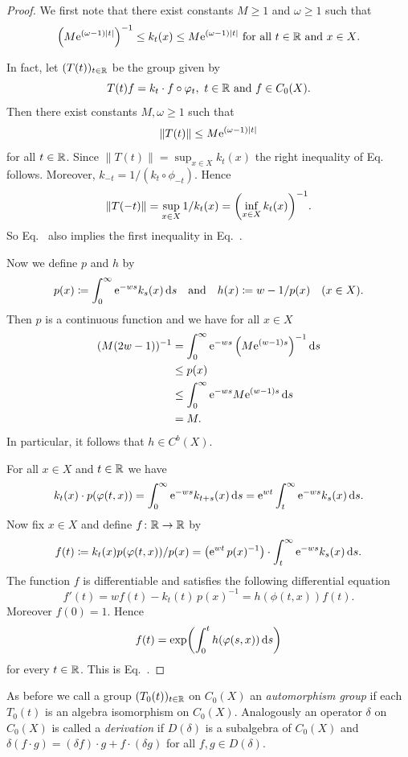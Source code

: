 \begin{proof}
We first note that there exist constants $M \geq 1 $ and $\omega \geq 1$ such that
\begin{equation}\label{eq:b2-3.16}
\mleft( M\eu^{(\omega-1)|t|} \mright)^{-1} \leq k_{t}(x) 
	\leq M\eu^{(\omega-1)|t|} \text{ for all $t \in \R$ and  $x \in X$.}
\end{equation}

In fact, let $(T(t))_{t \in \mathbb{R}}$ be the group given by 
%
\[
	T(t)f = k_{t} \cdot f \circ \phi_{t}, 
	\text{ $ t \in \R$ and $f \in C_{0}(X)$}.
\]
%
Then there exist constants $M, \omega \geq 1$ such that
\begin{equation}\label{eq:b2-3.17}
\|T(t)\| \leq M\eu^{(\omega-1)|t|}
\end{equation}
for all $t \in \mathbb{R}$.
Since $\|T(t)\| = \sup_{x \in X} k_{t}(x)$ the right inequality of
Eq.~ follows.
Moreover, $k_{-t} = 1/(k_{t} \circ \phi_{-t})$.
Hence 
%
\[
	\|T(-t)\| = \sup_{x \in X} 1/k_{t}(x) = \mleft( \inf_{x \in X} k_{t}(x) \mright)^{-1} .
\]
%
So Eq.~ also implies the first inequality in Eq.~.

Now we define $p$ and $h$ by
\[
p(x) \coloneq \int_{0}^{\infty} \mathrm{e}^{-ws}k_{s}(x) \mathop{}\!\mathrm{d}{s} 
\quad \text{and} \quad 
h(x) \coloneq w - 1/p(x) \quad (x \in X).
\]
Then $p$ is a continuous function and we have for all $x \in X $
\begin{align*}
(M(2w - 1))^{-1} &= \int_{0}^{\infty} \eu^{-ws}\left(M\eu^{(w-1)s}\right)^{-1} \ds \\ 
&\leq p(x) \\ 
&\leq \int_{0}^{\infty} \eu^{-ws}M\eu^{(w-1)s} \ds \\
&= M .
\end{align*}
In particular, it follows that $h \in C^{b}(X)$.

For all $x \in X$ and $t \in \mathbb{R}$ we have 
\[
k_{t}(x) \cdot p(\phi(t,x)) = \int_{0}^{\infty} \eu^{-ws}k_{t+s}(x) \ds 
= \eu^{wt} \int_{t}^{\infty} \eu^{-ws}k_{s}(x) \ds.
\]
Now fix $x \in X$ and define $f \colon \mathbb{R} \to \mathbb{R}$ by 
\[
f(t) \coloneq k_{t}(x)p(\phi(t,x))/p(x) 
 = \mleft( \eu^{wt}\,p(x)^{-1} \mright) \cdot \int_{t}^{\infty} \eu^{-ws}k_{s}(x)  \ds.
\]
The function $f$ is differentiable and satisfies the following differential equation 
\[
f'(t) = wf(t)  - k_{t}(t)\,p(x)^{-1}  = h(\phi(t,x))f(t).
\]
Moreover $f(0) = 1$.
Hence %
\[
	f(t) = \exp \mleft( \int_{0}^{t} h(\phi(s,x)) \ds \mright)
\]
%
for every $t \in \mathbb{R}$.
This is Eq.~.
\end{proof}
As before we call a group $(T_{0}(t))_{t \in \mathbb{R}}$ on $C_{0}(X)$ an \emph{automorphism group} if each $T_{0}(t)$ is an algebra isomorphism on $C_{0}(X)$.
Analogously an operator $\delta$ on $C_{0}(X)$ is called a \emph{derivation} if\/ $D(\delta)$ is a subalgebra of\/ $C_{0}(X)$ and $\delta(f \cdot g) = (\delta f) \cdot g + f \cdot (\delta g)$ for all $f,g \in D(\delta)$.

